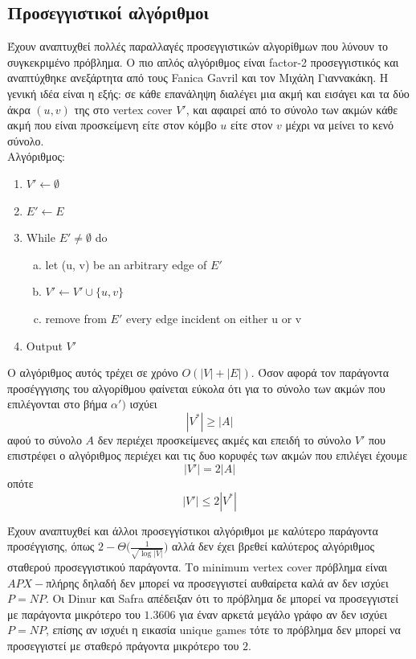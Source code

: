 \subsection{Προσεγγιστικοί αλγόριθμοι} 

Έχουν αναπτυχθεί πολλές παραλλαγές προσεγγιστικών αλγορίθμων που λύνουν το συγκεκριμένο πρόβλημα. Ο πιο απλός αλγόριθμος είναι factor-2  προσεγγιστικός και αναπτύχθηκε ανεξάρτητα από τους Fanica Gavril και τον Μιχάλη Γιαννακάκη. Η γενική ιδέα είναι η εξής: σε κάθε επανάληψη διαλέγει μια ακμή και εισάγει και τα δύο άκρα $(u, v)$ της στο vertex cover $V'$, και αφαιρεί από το σύνολο των ακμών κάθε ακμή που είναι προσκείμενη είτε στον κόμβο $u$ είτε στον $v$ μέχρι να μείνει το κενό σύνολο.\\
Αλγόριθμος:
\begin{enumerate}
\item $ V' \leftarrow \emptyset $
\item $ E' \leftarrow E$
\item While $ E' \neq {\emptyset} $ do
\begin{enumerate}[a)]
\item let (u, v) be an arbitrary edge of $E'$
\item $V' \leftarrow V' \cup \{u,v\}$
\item remove from $E'$ every edge incident on either u or v 
\end{enumerate}
\item Output $V'$
\end{enumerate}

Ο αλγόριθμος αυτός τρέχει σε χρόνο $O(|V| + |E|)$. Όσον αφορά τον παράγοντα προσέγγγισης του αλγορίθμου φαίνεται εύκολα ότι για το σύνολο των ακμών που επιλέγονται στο βήμα $\alpha')$ ισχύει 
$$|V^{*}| \geq |A|$$ 
αφού το σύνολο $Α$ δεν περιέχει προσκείμενες ακμές και επειδή το σύνολο $V'$ που επιστρέφει ο αλγόριθμος περιέχει και τις δυο κορυφές των ακμών που επιλέγει έχουμε 
$$|V'| = 2|A|$$ 
οπότε 
$$|V'| \leq 2|V^{*}|$$ 

Έχουν αναπτυχθεί και άλλοι προσεγγίστικοι αλγόριθμοι με καλύτερο παράγοντα προσέγγισης, όπως $2-\Theta\Big(\frac{1}{\sqrt{\log{|V|}}}\Big)$ αλλά δεν έχει βρεθεί καλύτερος αλγόριθμος σταθερού προσεγγιστικού παράγοντα. Το minimum vertex cover πρόβλημα είναι $APX-$πλήρης δηλαδή δεν μπορεί να προσεγγιστεί αυθαίρετα καλά αν δεν ισχύει $P=NP$. Οι Dinur και Safra απέδειξαν ότι το πρόβλημα δε μπορεί να προσεγγιστεί με παράγοντα μικρότερο του $1.3606$ για έναν αρκετά μεγάλο γράφο αν δεν ισχύει $P=NP$, επίσης αν ισχυέι η εικασία unique games τότε το πρόβλημα δεν μπορεί να προσεγγιστεί με σταθερό πράγοντα μικρότερο του $2$.